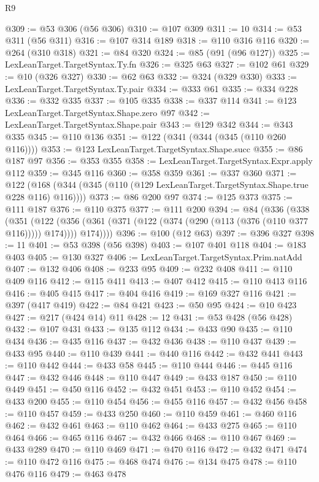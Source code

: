 \begin{lexlean}{R9}
\begin{coremodule}
@309 := @53 @306 (@56 @306)
@310 := @107 @309
@311 := 10
@314 := @53 @311 (@56 @311)
@316 := @107 @314 @189
@318 := @110 @316 @116
@320 := @264 (@310 @318)
@321 := @84 @320
@324 := @85 (@91 (@96 @127))
@325 := LexLeanTarget.TargetSyntax.Ty.fn
@326 := @325 @63
@327 := @102 @61
@329 := @10 (@326 @327)
@330 := @62 @63
@332 := @324 (@329 @330)
@333 := LexLeanTarget.TargetSyntax.Ty.pair
@334 := @333 @61
@335 := @334 @228
@336 := @332 @335
@337 := @105 @335
@338 := @337 @114
@341 := @123 LexLeanTarget.TargetSyntax.Shape.zero @97
@342 := LexLeanTarget.TargetSyntax.Shape.pair
@343 := @129 @342
@344 := @343 @335
@345 := @110 @136
@351 := @122 (@341 (@344 (@345 (@110 @260 @116))))
@353 := @123 LexLeanTarget.TargetSyntax.Shape.succ
@355 := @86 @187 @97
@356 := @353 @355
@358 := LexLeanTarget.TargetSyntax.Expr.apply @112
@359 := @345 @116
@360 := @358 @359
@361 := @337 @360
@371 := @122 (@168 (@344 (@345 (@110 (@129 LexLeanTarget.TargetSyntax.Shape.true @228 @116) @116))))
@373 := @86 @200 @97
@374 := @125 @373
@375 := @111 @187
@376 := @110 @375
@377 := @111 @200
@394 := @84
    (@336
      (@338
        (@351
          (@122
            (@356 (@361 (@371 (@122 (@374 (@290 (@113 (@376 (@110 @377 @116))))) @174))))
            @174))))
@396 := @100 (@12 @63)
@397 := @396 @327
@398 := 11
@401 := @53 @398 (@56 @398)
@403 := @107 @401 @118
@404 := @183 @403
@405 := @130 @327
@406 := LexLeanTarget.TargetSyntax.Prim.natAdd
@407 := @132 @406
@408 := @233 @95
@409 := @232 @408
@411 := @110 @409 @116
@412 := @115 @411
@413 := @407 @412
@415 := @110 @413 @116
@416 := @405 @415
@417 := @404 @416
@419 := @169 @327 @116
@421 := @397 (@417 @419)
@422 := @84 @421
@423 := @50 @95
@424 := @10 @423
@427 := @217 (@424 @14) @11
@428 := 12
@431 := @53 @428 (@56 @428)
@432 := @107 @431
@433 := @135 @112
@434 := @433 @90
@435 := @110 @434
@436 := @435 @116
@437 := @432 @436
@438 := @110 @437
@439 := @433 @95
@440 := @110 @439
@441 := @440 @116
@442 := @432 @441
@443 := @110 @442
@444 := @433 @58
@445 := @110 @444
@446 := @445 @116
@447 := @432 @446
@448 := @110 @447
@449 := @433 @187
@450 := @110 @449
@451 := @450 @116
@452 := @432 @451
@453 := @110 @452
@454 := @433 @200
@455 := @110 @454
@456 := @455 @116
@457 := @432 @456
@458 := @110 @457
@459 := @433 @250
@460 := @110 @459
@461 := @460 @116
@462 := @432 @461
@463 := @110 @462
@464 := @433 @275
@465 := @110 @464
@466 := @465 @116
@467 := @432 @466
@468 := @110 @467
@469 := @433 @289
@470 := @110 @469
@471 := @470 @116
@472 := @432 @471
@474 := @110 @472 @116
@475 := @468 @474
@476 := @134 @475
@478 := @110 @476 @116
@479 := @463 @478

\end{coremodule}
\end{lexlean}
